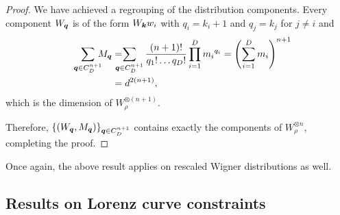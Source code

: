 \documentclass[pra,
aps,
twocolumn,
superscriptaddress,
groupedaddress,
nofootinbib,
reprint
]{revtex4-1}
\begin{document}
\begin{proof}
We have achieved a regrouping of the distribution components.
Every component $W_{\bm{q}}$ is of the form $W_{\bm{k}} w_i$ with $q_i = k_i + 1$ and $q_j = k_j$ for $j\neq i$ and 
\begin{align*}
	\sum_{\bmq \in C_D^{n+1}}  \hspace{-6pt} M_{\bmq} &=  \hspace{-10pt} \sum_{\bmq \in C_D^{n+1}} \frac{(n+1)!}{q_1!\dots q_D!} \prod\limits_{i=1}^D {m_i}^{q_i} = \left( \sum_{i=1}^D m_i \right)^{n+1} \hspace{-10pt} \\
	&= d^{2(n+1)},
\end{align*}
which is the dimension of $W_{\rho}^{\otimes (n+1)}$.

Therefore, $\{ (W_{\bm{q}}, M_{\bm{q}}) \}_{\bm{q} \in C_D^{n+1}}$ contains exactly the components of $W_{\rho}^{\otimes n}$, completing the proof.
\end{proof}
Once again, the above result applies on rescaled Wigner distributions as well.

\subsection{Results on Lorenz curve constraints}
\label{app:lc_constraints}
\end{document}
